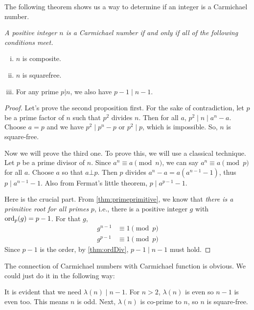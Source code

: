 \documentclass{subfile}
\begin{document}
The following theorem shows us a way to determine if an integer is a Carmichael number.

	\begin{theorem}\slshape
		A positive integer $n$ is a Carmichael number if and only if all of the following conditions meet.
		\begin{enumerate}[i.]
			\item $n$ is composite.
			\item $n$ is squarefree.
			\item For any prime $p|n$, we also have $p-1 \mid n-1$.
		\end{enumerate}
	\end{theorem}

	\begin{proof}
		Let's prove the second proposition first. For the sake of contradiction, let $p$ be a prime factor of $n$ such that $p^2$ divides $n$. Then for all $a$, $p^2 \mid n \mid a^n-a$. Choose $a=p$ and we have $p^2 \mid p^n-p$ or $p^2 \mid p$, which is impossible. So, $n$ is square-free.

		Now we will prove the third one. To prove this, we will use a classical technique. Let $p$ be a prime divisor of $n$. Since $a^n\equiv a\pmod n$, we can say $a^n\equiv a\pmod p$ for all $a$. Choose $a$ so that $a\bot p$. Then $p$ divides $a^n-a=a(a^{n-1}-1)$, thus $p \mid a^{n-1}-1$. Also from Fermat's little theorem, $p \mid a^{p-1}-1$.

		Here is the crucial part. From \autoref{thm:primeprimitive}, we know that \textit{there is a primitive root for all primes} $p$, i.e., there is a positive integer $g$ with $\operatorname{ord}_p(g)=p-1$. For that $g$,
		\begin{align*}
			g^{n-1}
				& \equiv1\pmod p\\
			g^{p-1}
				& \equiv1\pmod p
		\end{align*}
		Since $p-1$ is the order, by \autoref{thm:ordDiv}, $p-1 \mid n-1$ must hold.
	\end{proof}

	\begin{note}
		The connection of Carmichael numbers with Carmichael function is obvious. We could just do it in the following way:

		It is evident that we need $\lambda(n)\mid n-1$. For $n>2$, $\lambda(n)$ is even so $n-1$ is even too. This means $n$ is odd. Next, $\lambda(n)$ is co-prime to $n$, so $n$ is square-free.
	\end{note}
\end{document}
